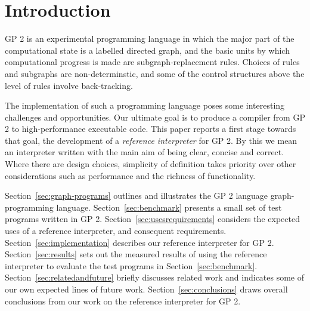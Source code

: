 \section{Introduction}

GP 2 is an experimental programming language in which the major part of
the computational state is a labelled directed graph, and the basic
units by which computational progress is made are subgraph-replacement
rules.
Choices of rules and subgraphs are non-determinstic, and some of
the control structures above the level of rules involve back-tracking.

The implementation of such a programming language poses some
interesting challenges and opportunities.
Our ultimate goal is to produce a compiler from GP 2 to
high-performance executable code.
This paper reports a first stage towards that goal, the development
of a \emph{reference interpreter}\/ for GP 2.
By this we mean an interpreter written with the main aim of
being clear, concise and correct.
Where there are design choices, simplicity of
definition takes priority over other considerations
such as performance and the richness of functionality.

Section~\ref{sec:graph-programs} outlines and illustrates the GP 2 language
graph-programming language.
Section~\ref{sec:benchmark} presents a small set of test programs
written in GP 2.
Section~\ref{sec:usesrequirements} considers the expected uses of
a reference interpreter, and consequent requirements.
Section~\ref{sec:implementation} describes our reference interpreter for
GP 2.
Section~\ref{sec:results} sets out the measured results of using the reference
interpreter to evaluate the test programs in Section~\ref{sec:benchmark}.
Section~\ref{sec:relatedandfuture} briefly discusses related work and
indicates some of our own expected lines of future work.
Section~\ref{sec:conclusions} draws overall conclusions from our work
on the reference interpreter for GP 2.

